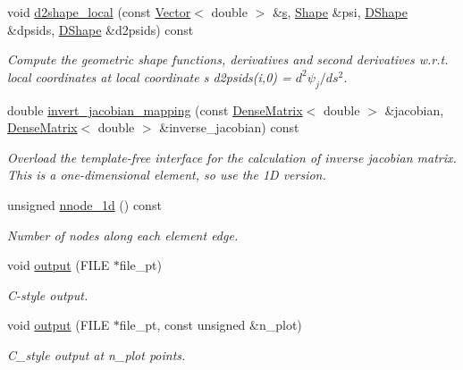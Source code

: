 \begin{DoxyCompactItemize}
void \hyperlink{classoomph_1_1QSpectralElement_3_011_00_01NNODE__1D_01_4_a1d7445c2348d96ac5349023edb150fe5}{d2shape\+\_\+local} (const \hyperlink{classoomph_1_1Vector}{Vector}$<$ double $>$ \&\hyperlink{cfortran_8h_ab7123126e4885ef647dd9c6e3807a21c}{s}, \hyperlink{classoomph_1_1Shape}{Shape} \&psi, \hyperlink{classoomph_1_1DShape}{D\+Shape} \&dpsids, \hyperlink{classoomph_1_1DShape}{D\+Shape} \&d2psids) const
\begin{DoxyCompactList}\small\item\em Compute the geometric shape functions, derivatives and second derivatives w.\+r.\+t. local coordinates at local coordinate s d2psids(i,0) = $ d^2 \psi_j / d s^2 $. \end{DoxyCompactList}\item 
double \hyperlink{classoomph_1_1QSpectralElement_3_011_00_01NNODE__1D_01_4_a0b5a8d5092c514611704fd4aa259fbfc}{invert\+\_\+jacobian\+\_\+mapping} (const \hyperlink{classoomph_1_1DenseMatrix}{Dense\+Matrix}$<$ double $>$ \&jacobian, \hyperlink{classoomph_1_1DenseMatrix}{Dense\+Matrix}$<$ double $>$ \&inverse\+\_\+jacobian) const
\begin{DoxyCompactList}\small\item\em Overload the template-\/free interface for the calculation of inverse jacobian matrix. This is a one-\/dimensional element, so use the 1D version. \end{DoxyCompactList}\item 
unsigned \hyperlink{classoomph_1_1QSpectralElement_3_011_00_01NNODE__1D_01_4_acb59fdd515326ef46eca9a065c5f6bcd}{nnode\+\_\+1d} () const
\begin{DoxyCompactList}\small\item\em Number of nodes along each element edge. \end{DoxyCompactList}\item 
void \hyperlink{classoomph_1_1QSpectralElement_3_011_00_01NNODE__1D_01_4_a9f8defda0dbde54edfb84353c6f3f794}{output} (F\+I\+LE $\ast$file\+\_\+pt)
\begin{DoxyCompactList}\small\item\em C-\/style output. \end{DoxyCompactList}\item 
void \hyperlink{classoomph_1_1QSpectralElement_3_011_00_01NNODE__1D_01_4_ae4debc9ccd8ac671dabca7bafc657683}{output} (F\+I\+LE $\ast$file\+\_\+pt, const unsigned \&n\+\_\+plot)
\begin{DoxyCompactList}\small\item\em C\+\_\+style output at n\+\_\+plot points. \end{DoxyCompactList}\item 

\end{DoxyCompactItemize}
